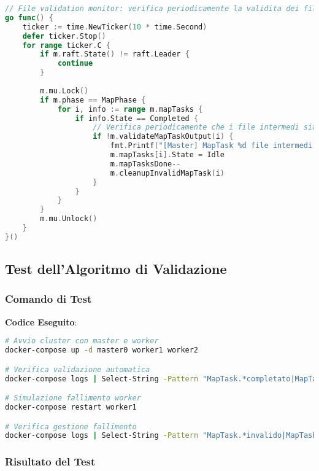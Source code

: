 \documentclass[12pt,a4paper]{article}
\begin{document}
\begin{lstlisting}[language=go]
// File validation monitor: verifica periodicamente la validita dei file intermedi
go func() {
    ticker := time.NewTicker(10 * time.Second)
    defer ticker.Stop()
    for range ticker.C {
        if m.raft.State() != raft.Leader {
            continue
        }
        
        m.mu.Lock()
        if m.phase == MapPhase {
            for i, info := range m.mapTasks {
                if info.State == Completed {
                    // Verifica periodicamente che i file intermedi siano ancora validi
                    if !m.validateMapTaskOutput(i) {
                        fmt.Printf("[Master] MapTask %d file intermedi corrotti, resetto a Idle\n", i)
                        m.mapTasks[i].State = Idle
                        m.mapTasksDone--
                        m.cleanupInvalidMapTask(i)
                    }
                }
            }
        }
        m.mu.Unlock()
    }
}()
\end{lstlisting}

\subsection{Test dell'Algoritmo di Validazione}

\subsubsection{Comando di Test}

\textbf{Codice Eseguito}:
\begin{lstlisting}[language=bash]
# Avvio cluster con master e worker
docker-compose up -d master0 worker1 worker2

# Verifica validazione automatica
docker-compose logs | Select-String -Pattern "MapTask.*completato|MapTask.*invalido|MapTask.*validato"

# Simulazione fallimento worker
docker-compose restart worker1

# Verifica gestione fallimento
docker-compose logs | Select-String -Pattern "MapTask.*invalido|MapTask.*completato ma file intermedi invalidi"
\end{lstlisting}

\subsubsection{Risultato del Test}
\end{document}
